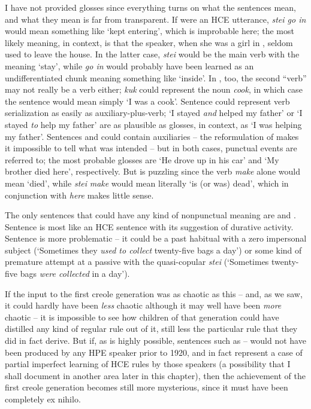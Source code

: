 \noindent I have not provided glosses since everything turns on what the sentences mean, and what they mean is far from transparent. If  were an HCE utterance, \textit{stei go in} would mean something like `kept entering', which is improbable here; the most likely meaning, in context, is that the speaker, when she was a girl in , seldom used to leave the house. In the latter case, \textit{stei} would be the main verb with the meaning `stay', while \textit{go in} would probably have been learned as an undifferentiated chunk meaning something like `inside'. In , too, the second ``verb'' may not really be a verb either; \textit{kuk} could represent the noun \textit{cook}, in which case the sentence would mean simply `I was a cook'. Sentence  could represent verb serialization as easily as auxiliary-plus-verb; `I stayed \textit{and} helped my father' or `I stayed \textit{to} help my father' are as plausible as glosses, in context, as `I was helping my father'. Sentences  and  could contain auxiliaries -- the reformu\-lation of  makes it impossible to tell what was intended -- but in both cases, punctual events are referred to; the most probable glosses are `He drove up in his car' and `My brother died here', respectively. But  is puzzling since the  verb \textit{make} alone would mean `died', while \textit{stei} \textit{make} would mean literally `is (or was) dead', which in conjunction with \textit{here} makes little sense.


The only sentences that could have any kind of nonpunctual meaning are  and . Sentence  is most like an HCE sentence with its suggestion of durative activity. Sentence  is more problematic -- it could be a past habitual with a zero impersonal subject (`Some\-times they \textit{used to collect} twenty-five bags a day') or some kind of premature attempt at a passive with the quasi-copular \textit{stei} (`Sometimes twenty-five bags \textit{were collected} in a day').

If the input to the first creole generation was as chaotic as this -- and, as we saw, it could hardly have been \textit{less} chaotic although it may well have been \textit{more} chaotic -- it is impossible to see how children of that generation could have distilled any kind of regular rule out of it, still less the particular rule that they did in fact derive. But if, as is highly possible, sentences such as -- would not have been produced by any HPE speaker prior to 1920, and in fact represent a case of partial imperfect learning of HCE rules by those speakers (a possibility that I shall document in another area later in this chapter), then the achievement of the first creole generation becomes still more mysterious, since it must have been completely ex nihilo.

